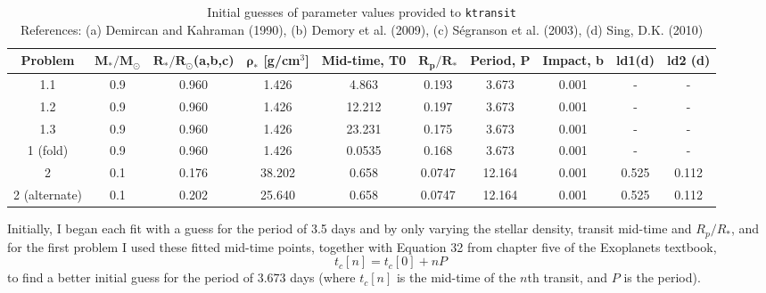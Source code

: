 \documentclass[10pt, preprint]{aastex}
\newcommand{\sol}{\ensuremath{\odot}}
\begin{document}
\begin{table}[!ht]
  \centering
  \footnotesize
  \begin{tabular}{cccccccccc}
    {\bf Problem} & {\bf $\mathbf{M_*/M_\sol}$} & {\bf $\mathbf{R_*/R_\sol}$}(a,b,c) & 
    {\bf $\mathbf{\rho_*}$ [g/cm$^3$]} & {\bf Mid-time, T0} & {\bf $\mathbf{R_p/R_*}$} & 
    {\bf Period, P} & {\bf Impact, b} & {\bf ld1}(d) & {\bf ld2} (d)\\ \hline
    1.1 & 0.9 & 0.960 & 1.426 & 4.863 & 0.193 & 3.673 & 0.001 &-&- \\
    1.2 & 0.9 & 0.960 & 1.426 & 12.212 & 0.197 & 3.673 & 0.001 &-&-\\
    1.3 & 0.9 & 0.960 & 1.426 & 23.231 & 0.175 & 3.673 & 0.001 &-&-\\
    1 (fold) & 0.9 & 0.960 & 1.426 & 0.0535 & 0.168 & 3.673 & 0.001 &-&-\\
    2&  0.1 & 0.176 & 38.202 & 0.658 & 0.0747 & 12.164 & 0.001 & 0.525 & 0.112\\
    2 (alternate) &  0.1 & 0.202 & 25.640 & 0.658 & 0.0747 & 12.164 & 0.001 & 0.525 & 0.112
\\
  \end{tabular}
  \caption{Initial guesses of parameter values provided to \protect \verb|ktransit| \\
    References: (a) Demircan and Kahraman (1990), (b) Demory et al. (2009), (c) S\'egranson et al. (2003), (d) Sing, D.K. (2010) \label{guesses}}
\end{table}

Initially, I began each fit with a guess for the period of 3.5 days and by only varying the stellar density, transit mid-time and $R_p/R_*$, and for the first problem I used these fitted mid-time points, together with Equation 32 from chapter five of the Exoplanets textbook, 
\begin{equation}
t_c[n] = t_c[0]+nP
\end{equation}
to find a better initial guess for the period of $3.673$ days (where $t_c[n]$ is the mid-time of the $n$th transit, and $P$ is the period).
\vspace{-20pt}
\end{document}
